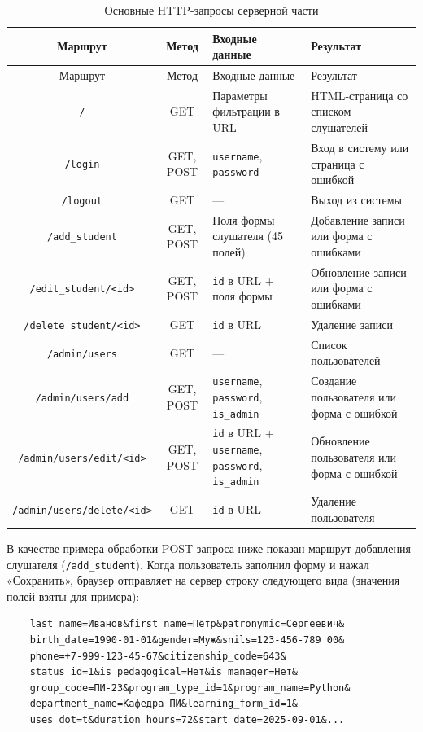 \begin{xltabular}{\textwidth}{|c|c|>{\raggedright\arraybackslash}p{3.5cm}|X|}
	\caption{Основные HTTP-запросы серверной части\label{tab:api}}\\ \hline
	\centrow Маршрут & \centrow Метод & \centrow Входные данные & \centrow Результат \\ \hline
	\endfirsthead
	\centrow Маршрут & \centrow Метод & \centrow Входные данные & \centrow Результат \\ \hline
	\finishhead
	\texttt{/} & GET & Параметры фильтрации в URL & HTML-страница со списком слушателей \\ \hline
	\texttt{/login} & GET, POST & \texttt{username}, \texttt{password} & Вход в систему или страница с ошибкой \\ \hline
	\texttt{/logout} & GET & --- & Выход из системы \\ \hline
	\texttt{/add\_student} & GET, POST & Поля формы слушателя (45 полей) & Добавление записи или форма с ошибками \\ \hline
	\texttt{/edit\_student/<id>} & GET, POST & \texttt{id} в URL + поля формы & Обновление записи или форма с ошибками \\ \hline
	\texttt{/delete\_student/<id>} & GET & \texttt{id} в URL & Удаление записи \\ \hline
	\texttt{/admin/users} & GET & --- & Список пользователей \\ \hline
	\texttt{/admin/users/add} & GET, POST & \texttt{username}, \texttt{password}, \texttt{is\_admin} & Создание пользователя или форма с ошибкой \\ \hline
	\texttt{/admin/users/edit/<id>} & GET, POST & \texttt{id} в URL + \texttt{username}, \texttt{password}, \texttt{is\_admin} & Обновление пользователя или форма с ошибкой \\ \hline
	\texttt{/admin/users/delete/<id>} & GET & \texttt{id} в URL & Удаление пользователя \\ \hline
\end{xltabular}

В качестве примера обработки POST-запроса ниже показан маршрут добавления слушателя (\texttt{/add\_student}). Когда пользователь заполнил форму и нажал «Сохранить», браузер отправляет на сервер строку следующего вида (значения полей взяты для примера):


\begin{verbatim}
	last_name=Иванов&first_name=Пётр&patronymic=Сергеевич&
	birth_date=1990-01-01&gender=Муж&snils=123-456-789 00&
	phone=+7-999-123-45-67&citizenship_code=643&
	status_id=1&is_pedagogical=Нет&is_manager=Нет&
	group_code=ПИ-23&program_type_id=1&program_name=Python&
	department_name=Кафедра ПИ&learning_form_id=1&
	uses_dot=t&duration_hours=72&start_date=2025-09-01&...
\end{verbatim}

